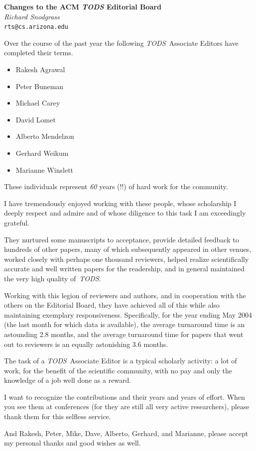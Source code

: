 \documentclass{article}[11pt]
\newcommand{\tods}{{\em TODS\/}}
\begin{document}
\begin{center}
{\Large\bf Changes to the ACM {\em TODS} Editorial Board}\\[2ex]
{\large\it  Richard Snodgrass}\\[1ex]
{\tt rts@cs.arizona.edu}\\[3ex]
\end{center}

\noindent
Over the course of the past year the following \tods\ Associate
Editors have completed their terms.

\begin{itemize}
\item Rakesh Agrawal
\item Peter Buneman
\item Michael Carey
\item David Lomet
\item Alberto Mendelzon
\item Gerhard Weikum
\item Marianne Winslett
\end{itemize}

\noindent
These individuals represent {\em 60} years (!!) of hard work for the
community.

I have tremendously enjoyed working with these people, whose scholarship
I deeply respect and admire and of whose diligence to this task I am
exceedingly grateful.

They nurtured some manuscripts to acceptance, provide
detailed feedback to hundreds of other papers, many of which subsequently
appeared in other venues, worked closely with perhaps one thousand
reviewers, helped realize scientifically accurate and well written papers
for the readership, and in general maintained the very high quality of~\tods.

Working with this legion of reviewers and authors, and in cooperation with
the others on the Editorial Board, they have achieved all of this while
also maintaining exemplary responsiveness. Specifically, for the year ending
May 2004 (the last month for which data is available), the average
turnaround time is an astounding 2.8 months, and the average turnaround time
for papers that went out to reviewers is an equally astonishing 3.6 months.

The task of a \tods\ Associate Editor is a typical scholarly
activity: a lot of work, for the benefit of the scientific community, with
no pay and only the knowledge of a job well done as a reward.

I want to recognize the contributions and their years and years of effort.
When you see them at conferences (for they are still all very active
researchers), please thank them for this selfless service.

And Rakesh, Peter, Mike, Dave, Alberto, Gerhard, and Marianne, please accept
my personal thanks and good wishes as well.
\end{document}
